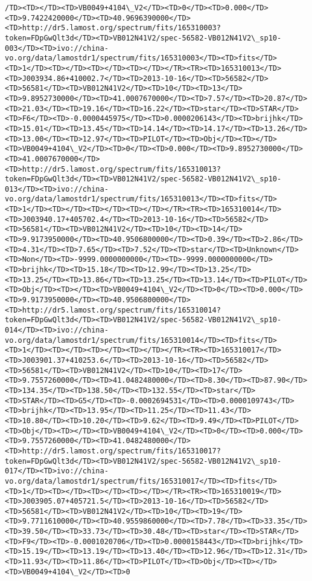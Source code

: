 \documentclass[11pt]{article}
\begin{document}
\begin{Verbatim}[commandchars=\\\{\}]
/TD><TD></TD><TD>VB0049+4104\_V2</TD><TD>0</TD><TD>0.000</TD><TD>9.7422420000</TD><TD>40.9696390000</TD><TD>http://dr5.lamost.org/spectrum/fits/165310003?token=FDpGwQlt3d</TD><TD>VB012N41V2/spec-56582-VB012N41V2\_sp10-003</TD><TD>ivo://china-vo.org/data/lamostdr1/spectrum/fits/165310003</TD><TD>fits</TD><TD>1</TD><TD></TD><TD></TD><TD></TD></TR><TR><TD>165310013</TD><TD>J003934.86+410002.7</TD><TD>2013-10-16</TD><TD>56582</TD><TD>56581</TD><TD>VB012N41V2</TD><TD>10</TD><TD>13</TD><TD>9.8952730000</TD><TD>41.0007670000</TD><TD>7.57</TD><TD>20.87</TD><TD>21.03</TD><TD>19.16</TD><TD>16.22</TD><TD>star</TD><TD>STAR</TD><TD>F6</TD><TD>-0.0000445975</TD><TD>0.0000206143</TD><TD>brijhk</TD><TD>15.01</TD><TD>13.45</TD><TD>14.14</TD><TD>14.17</TD><TD>13.26</TD><TD>13.00</TD><TD>12.97</TD><TD>PILOT</TD><TD>Obj</TD><TD></TD><TD>VB0049+4104\_V2</TD><TD>0</TD><TD>0.000</TD><TD>9.8952730000</TD><TD>41.0007670000</TD><TD>http://dr5.lamost.org/spectrum/fits/165310013?token=FDpGwQlt3d</TD><TD>VB012N41V2/spec-56582-VB012N41V2\_sp10-013</TD><TD>ivo://china-vo.org/data/lamostdr1/spectrum/fits/165310013</TD><TD>fits</TD><TD>1</TD><TD></TD><TD></TD><TD></TD></TR><TR><TD>165310014</TD><TD>J003940.17+405702.4</TD><TD>2013-10-16</TD><TD>56582</TD><TD>56581</TD><TD>VB012N41V2</TD><TD>10</TD><TD>14</TD><TD>9.9173950000</TD><TD>40.9506800000</TD><TD>0.39</TD><TD>2.86</TD><TD>4.31</TD><TD>7.65</TD><TD>7.52</TD><TD>star</TD><TD>Unknown</TD><TD>Non</TD><TD>-9999.0000000000</TD><TD>-9999.0000000000</TD><TD>brijhk</TD><TD>15.18</TD><TD>12.99</TD><TD>13.25</TD><TD>13.25</TD><TD>13.86</TD><TD>13.25</TD><TD>13.14</TD><TD>PILOT</TD><TD>Obj</TD><TD></TD><TD>VB0049+4104\_V2</TD><TD>0</TD><TD>0.000</TD><TD>9.9173950000</TD><TD>40.9506800000</TD><TD>http://dr5.lamost.org/spectrum/fits/165310014?token=FDpGwQlt3d</TD><TD>VB012N41V2/spec-56582-VB012N41V2\_sp10-014</TD><TD>ivo://china-vo.org/data/lamostdr1/spectrum/fits/165310014</TD><TD>fits</TD><TD>1</TD><TD></TD><TD></TD><TD></TD></TR><TR><TD>165310017</TD><TD>J003901.37+410253.6</TD><TD>2013-10-16</TD><TD>56582</TD><TD>56581</TD><TD>VB012N41V2</TD><TD>10</TD><TD>17</TD><TD>9.7557260000</TD><TD>41.0482480000</TD><TD>8.30</TD><TD>87.90</TD><TD>134.35</TD><TD>138.50</TD><TD>132.55</TD><TD>star</TD><TD>STAR</TD><TD>G5</TD><TD>-0.0002694531</TD><TD>0.0000109743</TD><TD>brijhk</TD><TD>13.95</TD><TD>11.25</TD><TD>11.43</TD><TD>10.80</TD><TD>10.20</TD><TD>9.62</TD><TD>9.49</TD><TD>PILOT</TD><TD>Obj</TD><TD></TD><TD>VB0049+4104\_V2</TD><TD>0</TD><TD>0.000</TD><TD>9.7557260000</TD><TD>41.0482480000</TD><TD>http://dr5.lamost.org/spectrum/fits/165310017?token=FDpGwQlt3d</TD><TD>VB012N41V2/spec-56582-VB012N41V2\_sp10-017</TD><TD>ivo://china-vo.org/data/lamostdr1/spectrum/fits/165310017</TD><TD>fits</TD><TD>1</TD><TD></TD><TD></TD><TD></TD></TR><TR><TD>165310019</TD><TD>J003905.07+405721.5</TD><TD>2013-10-16</TD><TD>56582</TD><TD>56581</TD><TD>VB012N41V2</TD><TD>10</TD><TD>19</TD><TD>9.7711610000</TD><TD>40.9559860000</TD><TD>7.78</TD><TD>33.35</TD><TD>39.50</TD><TD>33.73</TD><TD>30.48</TD><TD>star</TD><TD>STAR</TD><TD>F9</TD><TD>-0.0001020706</TD><TD>0.0000158443</TD><TD>brijhk</TD><TD>15.19</TD><TD>13.19</TD><TD>13.40</TD><TD>12.96</TD><TD>12.31</TD><TD>11.93</TD><TD>11.86</TD><TD>PILOT</TD><TD>Obj</TD><TD></TD><TD>VB0049+4104\_V2</TD><TD>0
\end{Verbatim}
\end{document}
